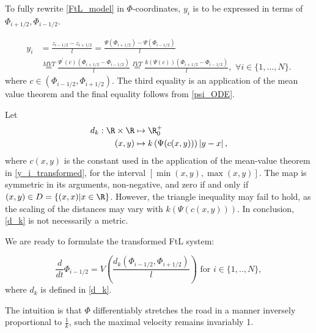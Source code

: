  
 To fully rewrite \eqref{FtL_model} in $\Phi$-coordinates, $y_i$ is to be expressed in terms of $\Phi_{i+1/2}, \Phi_{i-1/2}$. 

\begin{align} \label{y_i_transformed}
    y_i &= \frac{z_{i-1/2} - z_{i+1/2}}{l} 
     = \frac{\Psi(\Phi_{i+1/2}) - \Psi(\Phi_{i-1/2})}{l} \nonumber \\
     &\overset{MVT}{=} \frac{\Psi^{'}(c) \left(\Phi_{i+1/2} -\Phi_{i-1/2}\right)}{l} \overset{IVT}{=} \frac{k\left(\Psi(c)\right) \left(\Phi_{i+1/2} -\Phi_{i-1/2}\right)}{l}, \, \, \forall i \in \{1,...,N\}.
\end{align}
where $c \in (\Phi_{i-1/2},  \Phi_{i+1/2})$. The third equality is an application of the mean value theorem and the final equality follows from \eqref{psi_ODE}. 

Let 
\begin{align} \label{d_k}
	d_k : \R \times \R &\mapsto \R^+_0 \nonumber \\ 
	(x,y)  &\mapsto k\left(\Psi(c(x,y))\right) \left|y - x\right|,
\end{align} 
where $c(x,y)$ is the constant used in the application of the mean-value theorem in \eqref{y_i_transformed}, for the interval $[\min(x,y), \max(x,y)]$.  The map is symmetric in its arguments, non-negative, and zero if and only if $(x,y) \in D=\{{(x,x)|x\in \R}\}$. However, the triangle inequality may fail to hold, as the scaling of the distances may vary with $k\left(\Psi(c(x,y))\right)$. In conclusion, \eqref{d_k} is not necessarily a metric.

We are ready to formulate the transformed FtL system:

\begin{equation}\label{FtL_transformed2}  
   \frac{d}{dt} \Phi_{i-1/2}  = V\left(\frac{d_k(\Phi_{i-1/2}, \Phi_{i+1/2})}{l}\right) \text{ for } i \in \{1,..,N\},
\end{equation}
where $d_k$ is defined in \eqref{d_k}. 


The intuition is that $\Phi$ differentiably stretches the road in a manner inversely proportional to $\frac{1}{k}$, such the maximal velocity remains invariably 1. 

